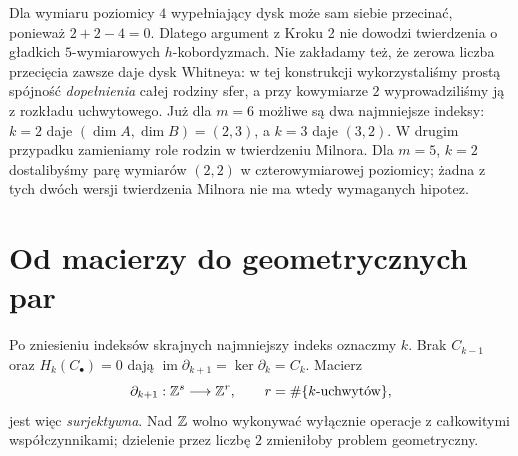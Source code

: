\begin{uwaga}
Dla wymiaru poziomicy $4$
wypełniający dysk może sam siebie
przecinać, ponieważ $2+2-4=0$.
Dlatego argument z Kroku 2
nie dowodzi twierdzenia o
gładkich $5$-wymiarowych
$h$-kobordyzmach.
Nie zakładamy też, że
zerowa liczba przecięcia
zawsze daje dysk Whitneya:
w tej konstrukcji wykorzystaliśmy prostą
spójność \emph{dopełnienia} całej rodziny sfer,
a przy kowymiarze $2$ wyprowadziliśmy ją z rozkładu uchwytowego.
Już dla $m=6$ możliwe są dwa najmniejsze indeksy:
$k=2$ daje $(\dim A,\dim B)=(2,3)$, a $k=3$ daje $(3,2)$.
W drugim przypadku zamieniamy role rodzin w twierdzeniu Milnora.
Dla $m=5$, $k=2$ dostalibyśmy parę wymiarów $(2,2)$
w czterowymiarowej poziomicy; żadna z tych dwóch wersji
twierdzenia Milnora nie ma wtedy wymaganych hipotez.
\end{uwaga}

\section{Od macierzy do geometrycznych par}
\label{sec:macierze-hc-19}

Po zniesieniu indeksów skrajnych
najmniejszy indeks oznaczmy $k$.
Brak $C_{k-1}$ oraz
$H_k(C_\bullet)=0$ dają
$\operatorname{im}\partial_{k+1}
=\ker\partial_k=C_k$.
Macierz
\[
 \partial_{k+1}:\mathbb{Z}^s\longrightarrow\mathbb{Z}^r,
 \qquad r=\#\{k\text{-uchwytów}\},
\]
jest więc \emph{surjektywna}.
Nad $\mathbb{Z}$ wolno wykonywać
wyłącznie operacje z
całkowitymi współczynnikami;
dzielenie przez liczbę $2$
zmieniłoby problem geometryczny.

